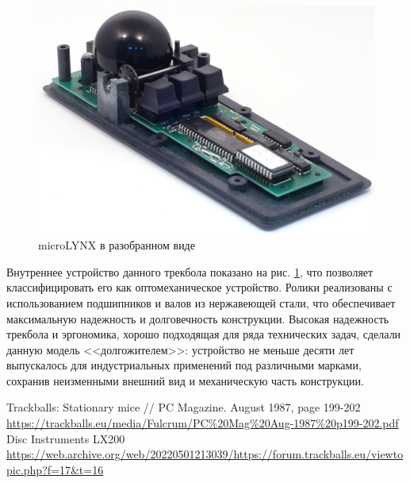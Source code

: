 \documentclass[11pt, a4paper]{article}
\begin{document}
\begin{figure}[h]
    \centering
    \includegraphics[scale=0.52]{1986_honeywell_microlynx_trackball/inside_60.jpg}
    \caption{microLYNX в разобранном виде}
    \label{fig:microLYNXInside}
\end{figure}

Внутреннее устройство данного трекбола показано на рис. \ref{fig:microLYNXInside}, что позволяет классифицировать его как оптомеханическое устройство. Ролики реализованы с использованием подшипников и валов из нержавеющей стали, что обеспечивает максимальную надежность и долговечность конструкции. Высокая надежность трекбола и эргономика, хорошо подходящая для ряда технических задач, сделали данную модель <<долгожителем>>: устройство не меньше десяти лет выпускалось для индустриальных применений под различными марками, сохранив неизменными внешний вид и механическую часть конструкции.

\begin{thebibliography}{9}
 Trackballs: Stationary mice // PC Magazine. August 1987, page 199-202 \url{https://trackballs.eu/media/Fulcrum/PC%20Mag%20Aug-1987%20p199-202.pdf}
 Disc Instruments LX200 \url{https://web.archive.org/web/20220501213039/https://forum.trackballs.eu/viewtopic.php?f=17&t=16}
\end{thebibliography}
\end{document}
